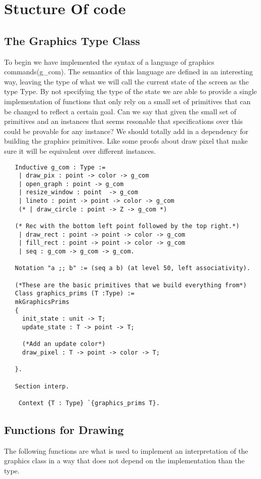 \documentclass{llncs}
\begin{document}
\section{Stucture Of code}

\subsection{The Graphics Type Class}
 To begin we have implemented the syntax of a language of graphics commands(g\_com). The semantics of this language are defined in an interesting way, leaving the type of what we will call the current state of the screen as the type Type.  By not specifying the type of the state we are able to
 provide a single implementation of functions that only rely on a small set of primitives that can be changed to reflect a certain goal.
 {\color{red} Can we say that given the small set of primitives and an instances that seems resonable that specifications over this could be
   provable for any instance? We should totally add in a dependency for building the graphics primitives.  Like some proofs about draw pixel that
  make sure it will be equivalent over different instances. }

\begin{lstlisting}
   Inductive g_com : Type :=
    | draw_pix : point -> color -> g_com
    | open_graph : point -> g_com
    | resize_window : point  -> g_com
    | lineto : point -> point -> color -> g_com
    (* | draw_circle : point -> Z -> g_com *)

   (* Rec with the bottom left point followed by the top right.*)          
    | draw_rect : point -> point -> color -> g_com
    | fill_rect : point -> point -> color -> g_com
    | seq : g_com -> g_com -> g_com.

   Notation "a ;; b" := (seq a b) (at level 50, left associativity).

   (*These are the basic primitives that we build everything from*)
   Class graphics_prims (T :Type) :=
   mkGraphicsPrims
   {
     init_state : unit -> T;
     update_state : T -> point -> T;

     (*Add an update color*)
     draw_pixel : T -> point -> color -> T;

   }.

   Section interp.

    Context {T : Type} `{graphics_prims T}.
  \end{lstlisting}



\subsection{Functions for Drawing}
The following functions are what is used to implement an interpretation of the graphics class in a way that does not depend on the implementation than the type.
\end{document}
